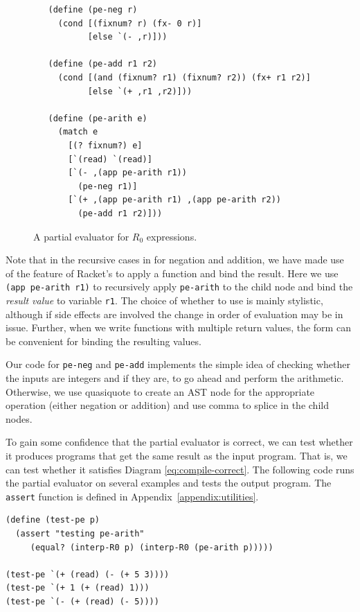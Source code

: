 \documentclass[11pt]{book}
\begin{document}
\begin{figure}[tbp]
\begin{lstlisting}
   (define (pe-neg r)
     (cond [(fixnum? r) (fx- 0 r)]
           [else `(- ,r)]))

   (define (pe-add r1 r2)
     (cond [(and (fixnum? r1) (fixnum? r2)) (fx+ r1 r2)]
           [else `(+ ,r1 ,r2)]))

   (define (pe-arith e)
     (match e
       [(? fixnum?) e]
       [`(read) `(read)]
       [`(- ,(app pe-arith r1))
         (pe-neg r1)]
       [`(+ ,(app pe-arith r1) ,(app pe-arith r2))
         (pe-add r1 r2)]))
\end{lstlisting}
\caption{A partial evaluator for $R_0$ expressions.}
\label{fig:pe-arith}
\end{figure}

Note that in the recursive cases in  for negation and
addition, we have made use of the  feature of Racket's
 to apply a function and bind the result.  Here we use
\lstinline{(app pe-arith r1)} to recursively apply \texttt{pe-arith}
to the child node and bind the \emph{result value} to variable
\texttt{r1}.  The choice of whether to use  is mainly
stylistic, although if side effects are involved the change in order
of evaluation may be in issue.  Further, when we write functions with
multiple return values, the  form can be convenient for
binding the resulting values.

Our code for \texttt{pe-neg} and \texttt{pe-add} implements the simple
idea of checking whether the inputs are integers and if they are, to
go ahead and perform the arithmetic.  Otherwise, we use quasiquote to
create an AST node for the appropriate operation (either negation or
addition) and use comma to splice in the child nodes.

To gain some confidence that the partial evaluator is correct, we can
test whether it produces programs that get the same result as the
input program. That is, we can test whether it satisfies Diagram
\eqref{eq:compile-correct}. The following code runs the partial
evaluator on several examples and tests the output program.  The
\texttt{assert} function is defined in Appendix~\ref{appendix:utilities}.
\begin{lstlisting}
(define (test-pe p)
  (assert "testing pe-arith"
     (equal? (interp-R0 p) (interp-R0 (pe-arith p)))))

(test-pe `(+ (read) (- (+ 5 3))))
(test-pe `(+ 1 (+ (read) 1)))
(test-pe `(- (+ (read) (- 5))))
\end{lstlisting}
\end{document}
